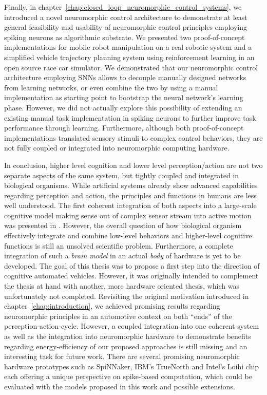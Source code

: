 Finally, in chapter~\ref{chap:closed_loop_neuromorphic_control_systems}, we introduced a novel neuromorphic control architecture to demonstrate at least general feasibility and usability of neuromorphic control principles employing spiking neurons as algorithmic substrate.
We presented two proof-of-concept implementations for mobile robot manipulation on a real robotic system and a simplified vehicle trajectory planning system using reinforcement learning in an open source race car simulator.
We demonstrated that our neuromorphic control architecture employing \acp{SNN} allows to decouple manually designed networks from learning networks, or even combine the two by using a manual implementation as starting point to bootstrap the neural network's learning phase.
However, we did not actually explore this possibility of extending an existing manual task implementation in spiking neurons to further improve task performance through learning.
Furthermore, although both proof-of-concept implementations translated sensory stimuli to complex control behaviors, they are not fully coupled or integrated into neuromorphic computing hardware.

In conclusion, higher level cognition and lower level perception/action are not two separate aspects of the same system, but tightly coupled and integrated in biological organisms.
While artificial systems already show advanced capabilities regarding perception and action, the principles and functions in humans are less well understood.
The first coherent integration of both aspects into a large-scale cognitive model making sense out of complex sensor stream into active motion was presented in \textcite{Eliasmith2012}.
However, the overall question of how biological organism effectively integrate and combine low-level behaviors and higher-level cognitive functions is still an unsolved scientific problem.
Furthermore, a complete integration of such a \emph{brain model} in an actual \emph{body} of hardware is yet to be developed.
The goal of this thesis was to propose a first step into the direction of cognitive automated vehicles.
However, it was originally intended to complement the thesis at hand with another, more hardware oriented thesis, which was unfortunately not completed.
Revisiting the original motivation introduced in chapter~\ref{chap:introduction}, we achieved promising results regarding neuromorphic principles in an automotive context on both \enquote{ends} of the perception-action-cycle.
However, a coupled integration into one coherent system as well as the integration into neuromorphic hardware to demonstrate benefits regarding energy-efficiency of our proposed approaches is still missing and an interesting task for future work.
There are several promising neuromorphic hardware prototypes such as \ac{SpiNNaker}, IBM's TrueNorth and Intel's Loihi chip each offering a unique perspective on spike-based computation, which could be evaluated with the models proposed in this work and possible extensions.

